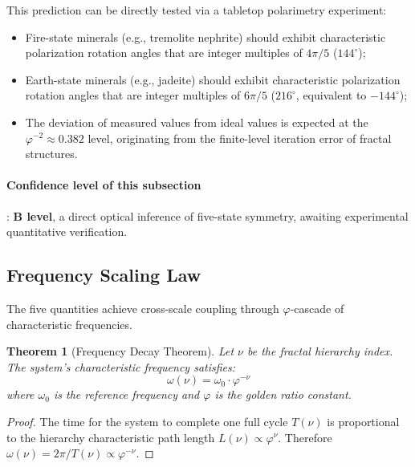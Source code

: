 \documentclass[12pt,a4paper,twocolumn]{article}
\renewcommand{\phi}{\varphi}
\newtheorem{theorem}{Theorem}[section]
\begin{document}
This prediction can be directly tested via a tabletop polarimetry experiment:
\begin{itemize}
\item Fire-state minerals (e.g., tremolite nephrite) should exhibit characteristic polarization rotation angles that are integer multiples of $4\pi/5$ ($144^\circ$);
\item Earth-state minerals (e.g., jadeite) should exhibit characteristic polarization rotation angles that are integer multiples of $6\pi/5$ ($216^\circ$, equivalent to $-144^\circ$);
\item The deviation of measured values from ideal values is expected at the $\phi^{-2} \approx 0.382$ level, originating from the finite-level iteration error of fractal structures.
\end{itemize}

\paragraph{Confidence level of this subsection}: \textbf{B level}, a direct optical inference of five-state symmetry, awaiting experimental quantitative verification.

\subsection{Frequency Scaling Law}
\label{subsec:frequency}
\label{subsec:frequency}

The five quantities achieve cross-scale coupling through $\phi$-cascade of characteristic frequencies.

\begin{theorem}[Frequency Decay Theorem]
Let $\nu$ be the fractal hierarchy index. The system's characteristic frequency satisfies:
\begin{equation}
\omega(\nu) = \omega_0 \cdot \phi^{-\nu}
\end{equation}
where $\omega_0$ is the reference frequency and $\phi$ is the golden ratio constant.
\end{theorem}

\begin{proof}
The time for the system to complete one full cycle $T(\nu)$ is proportional to the hierarchy characteristic path length $L(\nu) \propto \phi^\nu$. Therefore $\omega(\nu) = 2\pi/T(\nu) \propto \phi^{-\nu}$.
\end{proof}
\end{document}

